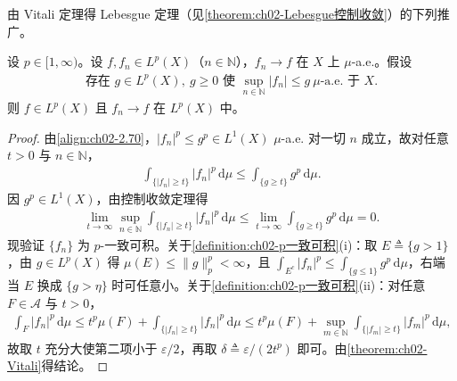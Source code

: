 \documentclass[../../main.tex]{subfiles}%
\begin{document}
由 Vitali 定理得 Lebesgue 定理（见\cref{theorem:ch02-Lebesgue控制收敛}）的下列推广。

\begin{theorem}\label{theorem:ch02-Vitali推广}
设 $p\in[1,\infty)$。设 $f,f_n\in L^p(X)$（$n\in\mathbb N$），$f_n\to f$ 在 $X$ 上 $\mu$-a.e.。假设
\begin{align}
\text{存在 }g\in L^p(X),\ g\geqslant0\text{ 使 }\sup_{n\in\mathbb N}|f_n|\leqslant g\ \mu\text{-a.e. 于 }X. \label{align:ch02-2.70}
\end{align}
则 $f\in L^p(X)$ 且 $f_n\to f$ 在 $L^p(X)$ 中。
\end{theorem}

\begin{proof}
由\eqref{align:ch02-2.70}，$|f_n|^p\leqslant g^p\in L^1(X)$ $\mu$-a.e. 对一切 $n$ 成立，故对任意 $t>0$ 与 $n\in\mathbb N$，
\begin{align*}
\int_{\{|f_n|\geqslant t\}}|f_n|^p\,\mathrm{d}\mu\leqslant\int_{\{g\geqslant t\}}g^p\,\mathrm{d}\mu.
\end{align*}
因 $g^p\in L^1(X)$，由控制收敛定理得
\begin{align*}
\lim_{t\to\infty}\sup_{n\in\mathbb N}\int_{\{|f_n|\geqslant t\}}|f_n|^p\,\mathrm{d}\mu\leqslant\lim_{t\to\infty}\int_{\{g\geqslant t\}}g^p\,\mathrm{d}\mu=0.
\end{align*}
现验证 $\{f_n\}$ 为 $p$-一致可积。关于\cref{definition:ch02-p一致可积}(i)：取 $E\triangleq\{g>1\}$，由 $g\in L^p(X)$ 得 $\mu(E)\leqslant\|g\|_p^p<\infty$，且 $\int_{E^c}|f_n|^p\leqslant\int_{\{g\leqslant1\}}g^p\,\mathrm{d}\mu$，右端当 $E$ 换成 $\{g>\eta\}$ 时可任意小。关于\cref{definition:ch02-p一致可积}(ii)：对任意 $F\in\mathscr A$ 与 $t>0$，
\begin{align*}
\int_F|f_n|^p\,\mathrm{d}\mu\leqslant t^p\mu(F)+\int_{\{|f_n|\geqslant t\}}|f_n|^p\,\mathrm{d}\mu\leqslant t^p\mu(F)+\sup_{m\in\mathbb N}\int_{\{|f_m|\geqslant t\}}|f_m|^p\,\mathrm{d}\mu,
\end{align*}
故取 $t$ 充分大使第二项小于 $\varepsilon/2$，再取 $\delta\triangleq\varepsilon/(2t^p)$ 即可。由\cref{theorem:ch02-Vitali}得结论。
\end{proof}
\end{document}
